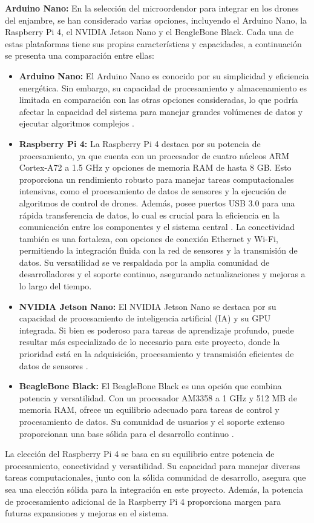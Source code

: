 \textbf{Arduino Nano:}
En la selección del microordendor para integrar en los drones del enjambre, se han considerado varias opciones, incluyendo el Arduino Nano, la Raspberry Pi 4, el NVIDIA Jetson Nano y el BeagleBone Black. Cada una de estas plataformas tiene sus propias características y capacidades, a continuación se presenta una comparación entre ellas:
\begin{itemize}
\item \textbf{Arduino Nano:}
El Arduino Nano es conocido por su simplicidad y eficiencia energética. Sin embargo, su capacidad de procesamiento y almacenamiento es limitada en comparación con las otras opciones consideradas, lo que podría afectar la capacidad del sistema para manejar grandes volúmenes de datos y ejecutar algoritmos complejos \cite{ arduinonano}.
\item \textbf{Raspberry Pi 4:}
La Raspberry Pi 4 destaca por su potencia de procesamiento, ya que cuenta con un procesador de cuatro núcleos ARM Cortex-A72 a 1.5 GHz y opciones de memoria RAM de hasta 8 GB. Esto proporciona un rendimiento robusto para manejar tareas computacionales intensivas, como el procesamiento de datos de sensores y la ejecución de algoritmos de control de drones. Además, posee puertos USB 3.0 para una rápida transferencia de datos, lo cual es crucial para la eficiencia en la comunicación entre los componentes y el sistema central \cite{ raspberry }.
La conectividad también es una fortaleza, con opciones de conexión Ethernet y Wi-Fi, permitiendo la integración fluida con la red de sensores y la transmisión de datos. Su versatilidad se ve respaldada por la amplia comunidad de desarrolladores y el soporte continuo, asegurando actualizaciones y mejoras a lo largo del tiempo.
\item \textbf{NVIDIA Jetson Nano:}
El NVIDIA Jetson Nano se destaca por su capacidad de procesamiento de inteligencia artificial (IA) y su GPU integrada. Si bien es poderoso para tareas de aprendizaje profundo, puede resultar más especializado de lo necesario para este proyecto, donde la prioridad está en la adquisición, procesamiento y transmisión eficientes de datos de sensores \cite{ jetson}.
\item \textbf{BeagleBone Black:}
El BeagleBone Black es una opción que combina potencia y versatilidad. Con un procesador AM3358 a 1 GHz y 512 MB de memoria RAM, ofrece un equilibrio adecuado para tareas de control y procesamiento de datos. Su comunidad de usuarios y el soporte extenso proporcionan una base sólida para el desarrollo continuo \cite{ beagle}.
\end{itemize}
La elección del Raspberry Pi 4 se basa en su equilibrio entre potencia de procesamiento, conectividad y versatilidad. Su capacidad para manejar diversas tareas computacionales, junto con la sólida comunidad de desarrollo, asegura que sea una elección sólida para la integración en este proyecto. Además, la potencia de procesamiento adicional de la Raspberry Pi 4 proporciona margen para futuras expansiones y mejoras en el sistema.


